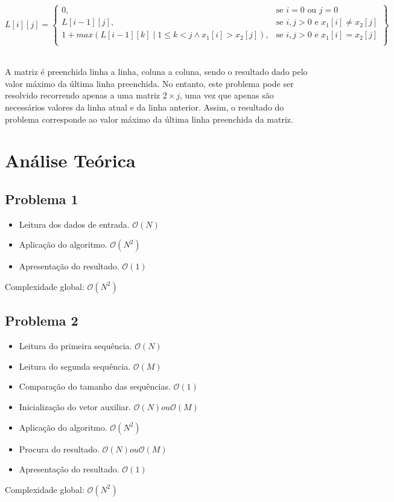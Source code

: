 \documentclass[12pt, letterpaper]{article}
\begin{document}
\begin{center}
	\[
	L[i][j] = \left\{\begin{array}{lr}
		0, & \text{se } i = 0 \text{ ou } j = 0\\
		L[i-1][j], & \text{se } i,j > 0 \text{ e } x_1[i] \neq x_2[j]\\
		1 +	max(L[i-1][k] \mid 1 \leq k < j \land x_1[i] > x_2[j]), & \text{se } i,j > 0 \text{ e } x_1[i] = x_2[j]\\
        \end{array}\right\}
	\]\\[\baselineskip]
\end{center}

A matriz é preenchida linha a linha, coluna a coluna, sendo o resultado dado
pelo valor máximo da última linha preenchida.
No entanto, este problema pode ser resolvido recorrendo apenas a uma matriz $2
\times j$, uma vez que apenas são necessários valores da linha atual e da linha
anterior. Assim, o resultado do problema corresponde ao valor máximo da última
linha preenchida da matriz.


\pagebreak
\section{Análise Teórica}

\subsection{Problema 1}
\begin{itemize}
	\item Leitura dos dados de entrada. $\mathcal{O}(N)$
	\item Aplicação do algoritmo. $\mathcal{O}(N^2)$
	\item Apresentação do resultado. $\mathcal{O}(1)$
\end{itemize}
Complexidade global: $\mathcal{O}(N^2)$

\subsection{Problema 2}
\begin{itemize}
	\item Leitura do primeira sequência. $\mathcal{O}(N)$
	\item Leitura do segunda sequência. $\mathcal{O}(M)$
	\item Comparação do tamanho das sequências. $\mathcal{O}(1)$
	\item Inicialização do vetor auxiliar. $\mathcal{O}(N) ou \mathcal{O}(M)$
	\item Aplicação do algoritmo. $\mathcal{O}(N^2)$
	\item Procura do resultado. $\mathcal{O}(N) ou \mathcal{O}(M)$
	\item Apresentação do resultado. $\mathcal{O}(1)$
\end{itemize}
Complexidade global: $\mathcal{O}(N^2)$
\end{document}
